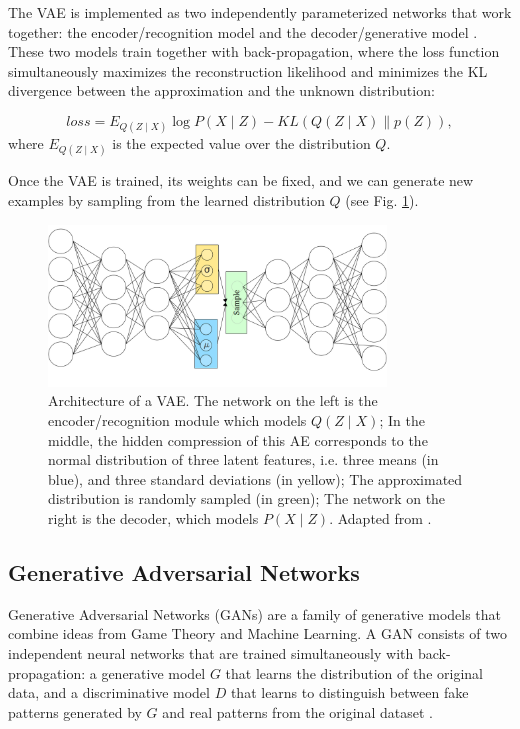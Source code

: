 \documentclass[runningheads]{llncs}
\begin{document}
The VAE is implemented as two independently parameterized networks that work together: the encoder/recognition model and the decoder/generative model \cite{bengio2017deep}. These two models train together with back-propagation, where the loss function simultaneously maximizes the reconstruction likelihood and minimizes the KL divergence between the approximation and the unknown distribution:

\begin{equation}
    loss = E_{Q(Z \mid X)} \log P(X \mid Z)-K L(Q(Z \mid X) \| p(Z)),
\end{equation}
where  \(E_{Q(Z \mid X)}\) is the expected value over the distribution \(Q\).
\newline

Once the VAE is trained, its weights can be fixed, and we can generate new examples by sampling from the learned distribution \(Q\) (see Fig. \ref{fig:VAE}).

\begin{figure}[h]
    \centering
    \includegraphics[width=0.8\textwidth]{introduction/img/VAE.png}
    \caption{Architecture of a VAE. The network on the left is the encoder/recognition module which models \(Q(Z \mid X)\); In the middle, the hidden compression of this AE corresponds to the normal distribution of three latent features, i.e. three means (in blue), and three standard deviations (in yellow); The approximated distribution is randomly sampled (in green); The network on the right is the decoder, which models \(P(X \mid Z)\). Adapted from \cite{shafkat2018VAE}.}
\label{fig:VAE}
\end{figure}

\subsection{Generative Adversarial Networks}
\label{sec:gen_GANs}
Generative Adversarial Networks (GANs) are a family of generative models that combine ideas from Game Theory and Machine Learning. A GAN consists of two independent neural networks that are trained simultaneously with back-propagation: a generative model $G$ that learns the distribution of the original data, and a discriminative model $D$ that learns to distinguish between fake patterns generated by $G$ and real patterns from the original dataset \cite{goodfellow2014generative}.
\end{document}
